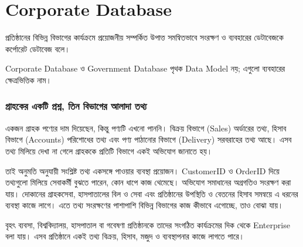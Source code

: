 \section{Corporate Database}
\label{sec:ch06-corporate-database}
\begin{definitionbox}{}
প্রতিষ্ঠানের বিভিন্ন বিভাগের কার্যক্রমে প্রয়োজনীয় সম্পর্কিত উপাত্ত সমন্বিতভাবে সংরক্ষণ ও ব্যবহারের ডেটাবেজকে কর্পোরেট ডেটাবেজ বলে।
\end{definitionbox}


Corporate Database ও Government Database পৃথক Data Model নয়; এগুলো ব্যবহারের ক্ষেত্রভিত্তিক নাম।


\subsubsection{গ্রাহকের একটি প্রশ্ন, তিন বিভাগের আলাদা তথ্য}
একজন গ্রাহক পণ্যের দাম দিয়েছেন, কিন্তু পণ্যটি এখনো পাননি। বিক্রয় বিভাগে (Sales) অর্ডারের তথ্য, হিসাব বিভাগে (Accounts) পরিশোধের তথ্য এবং পণ্য পাঠানোর বিভাগে (Delivery) সরবরাহের তথ্য আছে। এসব তথ্য মিলিয়ে দেখা না গেলে গ্রাহককে প্রতিটি বিভাগে একই অভিযোগ জানাতে হয়।

তাই অনুমতি অনুযায়ী সংশ্লিষ্ট তথ্য একসঙ্গে পাওয়ার ব্যবস্থা প্রয়োজন। CustomerID ও OrderID দিয়ে তথ্যগুলো মিলিয়ে সেবাকর্মী বুঝতে পারেন, কোন ধাপে কাজ থেমেছে। অভিযোগ সমাধানের অগ্রগতিও সংরক্ষণ করা যায়। দোকানের গ্রাহকসেবা, হাসপাতালের বিল ও সেবা এবং প্রতিষ্ঠানের উপস্থিতি ও বেতনের হিসাব সমন্বয়ে এ ধরনের ব্যবস্থা কাজে লাগে। এতে তথ্য সংরক্ষণের পাশাপাশি বিভিন্ন বিভাগের কাজ কীভাবে এগোচ্ছে, তাও বোঝা যায়।


বৃহৎ ব্যবসা, বিশ্ববিদ্যালয়, হাসপাতাল বা গবেষণা প্রতিষ্ঠানকে তাদের সংগঠিত কার্যক্রমের দিক থেকে Enterprise বলা যায়। এসব প্রতিষ্ঠানে একই তথ্য বিক্রয়, হিসাব, মজুদ ও ব্যবস্থাপনার কাজে লাগতে পারে।

